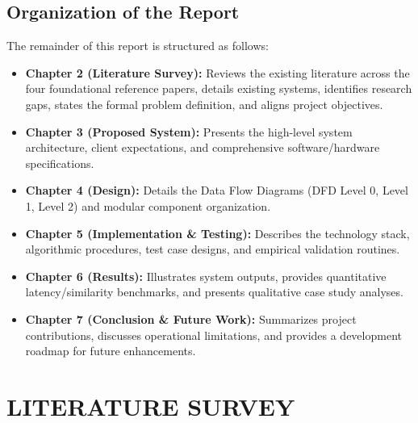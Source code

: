 \documentclass[12pt,a4paper]{report}
\begin{document}
\section{Organization of the Report}
The remainder of this report is structured as follows:
\begin{itemize}
    \item \textbf{Chapter 2 (Literature Survey):} Reviews the existing literature across the four foundational reference papers, details existing systems, identifies research gaps, states the formal problem definition, and aligns project objectives.
    \item \textbf{Chapter 3 (Proposed System):} Presents the high-level system architecture, client expectations, and comprehensive software/hardware specifications.
    \item \textbf{Chapter 4 (Design):} Details the Data Flow Diagrams (DFD Level 0, Level 1, Level 2) and modular component organization.
    \item \textbf{Chapter 5 (Implementation \& Testing):} Describes the technology stack, algorithmic procedures, test case designs, and empirical validation routines.
    \item \textbf{Chapter 6 (Results):} Illustrates system outputs, provides quantitative latency/similarity benchmarks, and presents qualitative case study analyses.
    \item \textbf{Chapter 7 (Conclusion \& Future Work):} Summarizes project contributions, discusses operational limitations, and provides a development roadmap for future enhancements.
\end{itemize}


\chapter{LITERATURE SURVEY}
\end{document}
